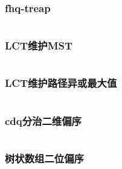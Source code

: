 \documentclass[a4paper,12pt]{article}
\begin{document}
\subsubsection{fhq-treap}
\inputminted[]{c++}{code/luoguP3369.cpp}
\subsubsection{LCT维护MST}
\inputminted[]{c++}{code/nc888E.cpp}
\subsubsection{LCT维护路径异或最大值}
\inputminted[]{c++}{code/luoguP3690.cpp}
\subsubsection{cdq分治二维偏序}
\inputminted[]{c++}{code/19njA.cpp}
\subsubsection{树状数组二位偏序}
\inputminted[]{c++}{code/19xzI.cpp}



\end{document}
